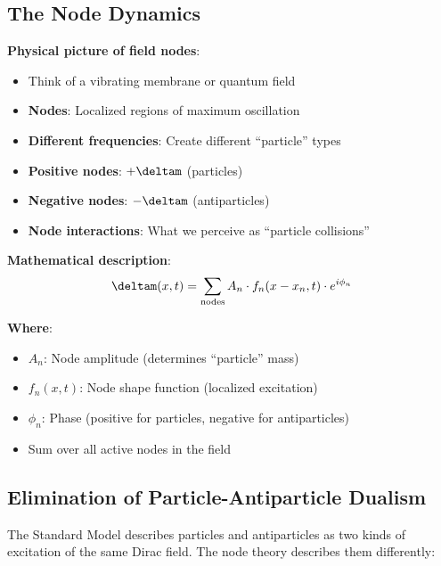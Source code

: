 	\subsection{The Node Dynamics}
	
	\textbf{Physical picture of field nodes}:
	\begin{itemize}
		\item Think of a vibrating membrane or quantum field
		\item \textbf{Nodes}: Localized regions of maximum oscillation
		\item \textbf{Different frequencies}: Create different ``particle'' types
		\item \textbf{Positive nodes}: $+\deltam$ (particles)
		\item \textbf{Negative nodes}: $-\deltam$ (antiparticles)
		\item \textbf{Node interactions}: What we perceive as ``particle collisions''
	\end{itemize}
	
	\textbf{Mathematical description}:
	\begin{equation}
		\deltam(x,t) = \sum_{\text{nodes}} A_n \cdot f_n(x-x_n, t) \cdot e^{i\phi_n}
	\end{equation}
	
	\textbf{Where}:
	\begin{itemize}
		\item $A_n$: Node amplitude (determines ``particle'' mass)
		\item $f_n(x,t)$: Node shape function (localized excitation)
		\item $\phi_n$: Phase (positive for particles, negative for antiparticles)
		\item Sum over all active nodes in the field
	\end{itemize}
	
	\subsection{Elimination of Particle-Antiparticle Dualism}
	
	The Standard Model describes particles and antiparticles as two kinds of excitation of the same Dirac field. The node theory describes them differently:
	
